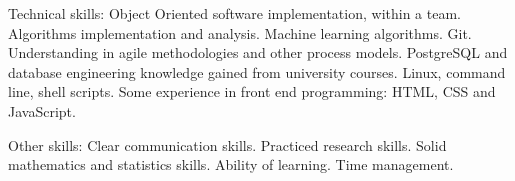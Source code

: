\documentclass[10pt,a4paper]{article}
\begin{document}
\inlineheadsection  %
  {Technical skills:}
  {Object Oriented software implementation, within a team. Algorithms implementation and analysis. Machine learning algorithms. Git. Understanding in agile methodologies and other process models. PostgreSQL and database engineering knowledge gained from university courses. Linux, command line, shell scripts. Some experience in front end programming: HTML, CSS and JavaScript.}

\vspace{0.5em}

\inlineheadsection  %
  {Other skills:}
  {Clear communication skills. Practiced research skills. Solid mathematics and statistics skills. Ability of learning. Time management.}

  
\spacedhrule{1.6em}{-0.4em}

\end{document}
